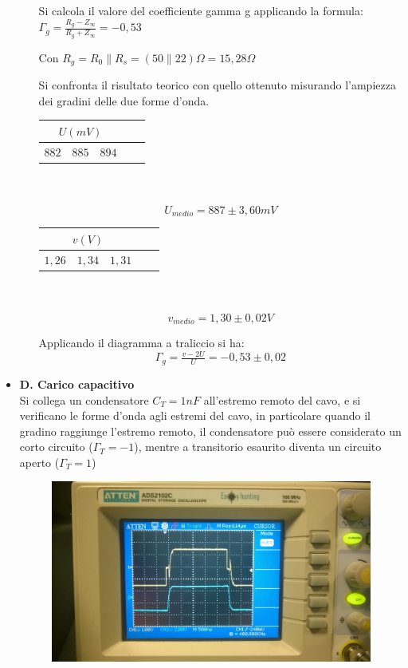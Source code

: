 \documentclass[a4paper]{article}
\begin{document}
\begin{itemize}
\begin{itemize}
Si calcola il valore del coefficiente gamma g applicando la formula: 
\(\Gamma _g=\tfrac{R_g-Z_\infty}{R_g+Z_\infty}= -0,53\)

Con \(R_g=R_0\parallel R_s= (50\parallel 22)\Omega = 15,28 \Omega\)

Si confronta il risultato teorico con quello ottenuto misurando l’ampiezza dei gradini delle due forme d’onda.
\begin{center}
 \begin{tabular}{|r|l|l|l|l|}
     \hline
     \multicolumn{3}{|c|}{\(U (mV)\)} \\
     \hline
     \(882\) & \(885\) & \(894\)\\
     \hline
   \end{tabular} \\ \\
\[U_{medio}=887 \pm 3,60 mV\]

\begin{tabular}{|r|l|l|l|l|}
     \hline
     \multicolumn{3}{|c|}{\(v (V)\)} \\
     \hline
     \(1,26\) & \(1,34\) & \(1,31\)\\
     \hline
   \end{tabular} \\ \\
\[v_{medio}=1,30 \pm 0,02 V\]
\end{center}
Applicando il diagramma a traliccio si ha:  
\[\Gamma_g = \tfrac{v-2U}{U} = -0,53 \pm 0,02\]
  \end{itemize}
\item []\textbf{D. Carico capacitivo} \\
  Si collega un condensatore \(C_T= 1 nF\) all’estremo remoto del cavo, e si verificano le forme d’onda agli estremi del cavo, in particolare quando il gradino raggiunge l’estremo remoto, il condensatore può essere considerato un corto circuito
 (\(\Gamma _T= -1\)), mentre a transitorio esaurito diventa un circuito aperto (\(\Gamma _T= 1\))

\begin{figure}[H]
\centering
\includegraphics[scale=0.07]{foto/foto16.jpg}
\end{figure}


\end{itemize}
\end{document}
